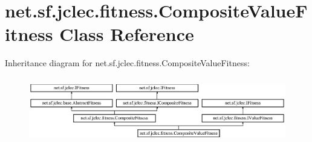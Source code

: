 \hypertarget{classnet_1_1sf_1_1jclec_1_1fitness_1_1_composite_value_fitness}{\section{net.\-sf.\-jclec.\-fitness.\-Composite\-Value\-Fitness Class Reference}
\label{classnet_1_1sf_1_1jclec_1_1fitness_1_1_composite_value_fitness}
}
Inheritance diagram for net.\-sf.\-jclec.\-fitness.\-Composite\-Value\-Fitness\-:\begin{figure}[H]
\begin{center}
\leavevmode
\includegraphics[height=2.905318cm]{classnet_1_1sf_1_1jclec_1_1fitness_1_1_composite_value_fitness}
\end{center}
\end{figure}
